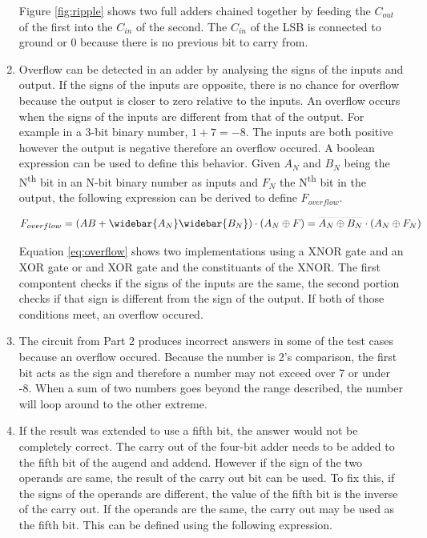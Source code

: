 \documentclass[CMPE]{KGCOEReport}
\def\lbar#1{\ThisStyle{%
  \setbox0=\hbox{$\SavedStyle#1$}%
  \stackengine{2.2\LMpt}{$\SavedStyle#1$}{\rule{\wd0}{0.1\LMpt}}{O}{c}{F}{F}{S}%
}}
\begin{document}
\begin{enumerate}
Figure \ref{fig:ripple} shows two full adders chained together by feeding the $C_{out}$ of the first into the $C_{in}$ of the second. The $C_{in}$ of the LSB is connected to ground or 0 because there is no previous bit to carry from.

  \item Overflow can be detected in an adder by analysing the signs of the inputs and output. If the signs of the inputs are opposite, there is no chance for overflow because the output is closer to zero relative to the inputs. An overflow occurs when the signs of the inputs are different from that of the output. For example in a 3-bit binary number, $1 + 7 = -8$. The inputs are both positive however the output is negative therefore an overflow occured. A boolean expression can be used to define this behavior. Given $A_N$ and $B_N$ being the N\textsuperscript{th} bit in an N-bit binary number as inputs and $F_N$ the N\textsuperscript{th} bit in the output, the following expression can be derived to define $F_{overflow}$.

\begin{equation}
\label{eq:overflow}
F_{overflow} = (AB + \widebar{A_N}\widebar{B_N}) \cdot (A_N \oplus F) = \lbar{A_N \oplus B_N} \cdot (A_N \oplus F_N)
\end{equation} 

Equation \ref{eq:overflow} shows two implementations using a XNOR gate and an XOR gate or and XOR gate and the constituants of the XNOR. The first compontent checks if the signs of the inputs are the same, the second portion checks if that sign is different from the sign of the output. If both of those conditions meet, an overflow occured.

  \item The circuit from Part 2 produces incorrect answers in some of the test cases because an overflow occured. Because the number is 2's comparison, the first bit acts as the sign and therefore a number may not exceed over 7 or under -8. When a sum of two numbers goes beyond the range described, the number will loop around to the other extreme.
  
  \item If the result was extended to use a fifth bit, the answer would not be completely correct. The carry out of the four-bit adder needs to be added to the fifth bit of the augend and addend. However if the sign of the two operands are same, the result of the carry out bit can be used. To fix this, if the signs of the operands are different, the value of the fifth bit is the inverse of the carry out. If the operands are the same, the carry out may be used as the fifth bit. This can be defined using the following expression.


\end{enumerate}
\end{document}
